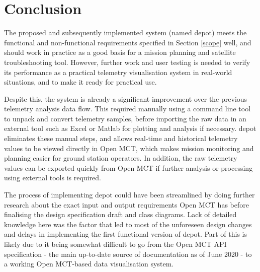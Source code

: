 \begin{comment}

\end{comment}

\section{Conclusion}
The proposed and subsequently implemented system (named \Gls{depot}) meets the functional and non-functional requirements specified in Section \ref{scope} well, and should work in practice as a good basis for a mission planning and satellite troubleshooting tool. However, further work and user testing is needed to verify its performance as a practical telemetry visualisation system in real-world situations, and to make it ready for practical use.

Despite this, the system is already a significant improvement over the previous telemetry analysis data flow. This required manually using a command line tool to unpack and convert telemetry samples, before importing the raw data in an external tool such as Excel or Matlab for plotting and analysis if necessary. \Gls{depot} eliminates these manual steps, and allows real-time and historical telemetry values to be viewed directly in Open MCT, which makes mission monitoring and planning easier for ground station operators. In addition, the raw telemetry values can be exported quickly from Open MCT if further analysis or processing using external tools is required.

The process of implementing \Gls{depot} could have been streamlined by doing further research about the exact input and output requirements Open MCT has before finalising the design specification draft and class diagrams. Lack of detailed knowledge here was the factor that led to most of the unforeseen design changes and delays in implementing the first functional version of \Gls{depot}. Part of this is likely due to it being somewhat difficult to go from the Open MCT API specification - the main up-to-date source of documentation as of June 2020 - to a working Open MCT-based data visualisation system.